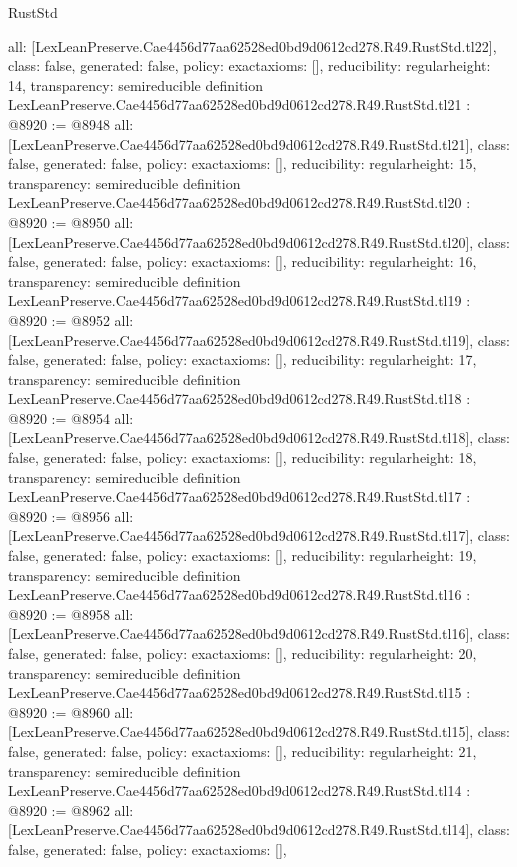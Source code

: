 \begin{lexlean}{RustStd}
\begin{coremodule}
{  all: [LexLeanPreserve.Cae4456d77aa62528ed0bd9d0612cd278.R49.RustStd.tl22],
  class: false,
  generated: false,
  policy: exact{axioms: []},
  reducibility: regular{height: 14},
  transparency: semireducible
}
definition LexLeanPreserve.Cae4456d77aa62528ed0bd9d0612cd278.R49.RustStd.tl21 : @8920 := @8948 {
  all: [LexLeanPreserve.Cae4456d77aa62528ed0bd9d0612cd278.R49.RustStd.tl21],
  class: false,
  generated: false,
  policy: exact{axioms: []},
  reducibility: regular{height: 15},
  transparency: semireducible
}
definition LexLeanPreserve.Cae4456d77aa62528ed0bd9d0612cd278.R49.RustStd.tl20 : @8920 := @8950 {
  all: [LexLeanPreserve.Cae4456d77aa62528ed0bd9d0612cd278.R49.RustStd.tl20],
  class: false,
  generated: false,
  policy: exact{axioms: []},
  reducibility: regular{height: 16},
  transparency: semireducible
}
definition LexLeanPreserve.Cae4456d77aa62528ed0bd9d0612cd278.R49.RustStd.tl19 : @8920 := @8952 {
  all: [LexLeanPreserve.Cae4456d77aa62528ed0bd9d0612cd278.R49.RustStd.tl19],
  class: false,
  generated: false,
  policy: exact{axioms: []},
  reducibility: regular{height: 17},
  transparency: semireducible
}
definition LexLeanPreserve.Cae4456d77aa62528ed0bd9d0612cd278.R49.RustStd.tl18 : @8920 := @8954 {
  all: [LexLeanPreserve.Cae4456d77aa62528ed0bd9d0612cd278.R49.RustStd.tl18],
  class: false,
  generated: false,
  policy: exact{axioms: []},
  reducibility: regular{height: 18},
  transparency: semireducible
}
definition LexLeanPreserve.Cae4456d77aa62528ed0bd9d0612cd278.R49.RustStd.tl17 : @8920 := @8956 {
  all: [LexLeanPreserve.Cae4456d77aa62528ed0bd9d0612cd278.R49.RustStd.tl17],
  class: false,
  generated: false,
  policy: exact{axioms: []},
  reducibility: regular{height: 19},
  transparency: semireducible
}
definition LexLeanPreserve.Cae4456d77aa62528ed0bd9d0612cd278.R49.RustStd.tl16 : @8920 := @8958 {
  all: [LexLeanPreserve.Cae4456d77aa62528ed0bd9d0612cd278.R49.RustStd.tl16],
  class: false,
  generated: false,
  policy: exact{axioms: []},
  reducibility: regular{height: 20},
  transparency: semireducible
}
definition LexLeanPreserve.Cae4456d77aa62528ed0bd9d0612cd278.R49.RustStd.tl15 : @8920 := @8960 {
  all: [LexLeanPreserve.Cae4456d77aa62528ed0bd9d0612cd278.R49.RustStd.tl15],
  class: false,
  generated: false,
  policy: exact{axioms: []},
  reducibility: regular{height: 21},
  transparency: semireducible
}
definition LexLeanPreserve.Cae4456d77aa62528ed0bd9d0612cd278.R49.RustStd.tl14 : @8920 := @8962 {
  all: [LexLeanPreserve.Cae4456d77aa62528ed0bd9d0612cd278.R49.RustStd.tl14],
  class: false,
  generated: false,
  policy: exact{axioms: []},
}
\end{coremodule}
\end{lexlean}
